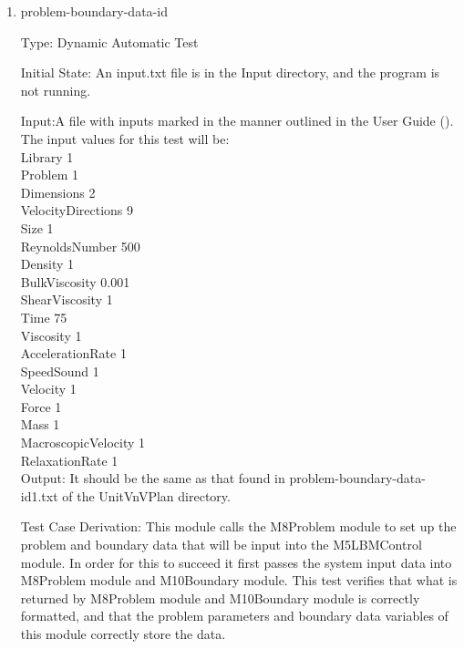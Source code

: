 \documentclass[12pt, titlepage]{article}
\newcounter{uvtestcounter} %
\begin{document}
\begin{enumerate}
	
	\item{problem-boundary-data-id\theuvtestcounter\\}
	
	Type: Dynamic Automatic Test
	
	Initial State: An input.txt file is in the Input directory, and the program is not running.
	
	Input:A file with inputs marked in the manner outlined in the
	User Guide (\citet{LBM_UserGuide_PM}).\\The input values for this test will
	be:\\
	
	Library 1\\
	Problem 1\\
	Dimensions 2\\
	VelocityDirections 9\\
	Size 1\\
	ReynoldsNumber 500\\
	Density 1\\
	BulkViscosity 0.001\\
	ShearViscosity 1\\
	Time 75\\
	Viscosity 1\\
	AccelerationRate 1\\
	SpeedSound 1\\
	Velocity 1\\
	Force 1\\
	Mass 1\\
	MacroscopicVelocity 1\\
	RelaxationRate 1\\
	
	Output: It should be the same as that found in problem-boundary-data-id1.txt of the UnitVnVPlan directory.
	
	Test Case Derivation: This module calls the M8Problem module to set up the problem and boundary data that will be input into the M5LBMControl module. In order for this to succeed it first passes the system input data into M8Problem module and M10Boundary module. This test verifies that what is returned by M8Problem module and M10Boundary module is correctly formatted, and that the problem parameters and boundary data variables of this module correctly store the data.
	

\end{enumerate}
\end{document}
